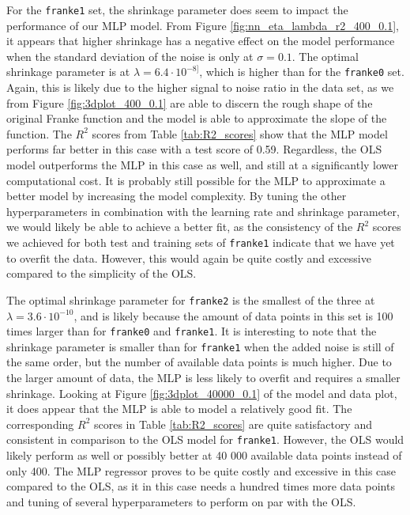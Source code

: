 \documentclass[a4paper, 11pt, twocolumn]{article}
\begin{document}
For the \texttt{franke1} set, the shrinkage parameter does seem to impact the 
performance of our MLP model. From Figure \ref{fig:nn_eta_lambda_r2_400_0.1}, it 
appears that higher shrinkage has a negative effect on the model performance when 
the standard deviation of the noise is only at $\sigma=0.1$. The 
optimal shrinkage parameter is at $\lambda=6.4\cdot 10^{-8]}$, which is higher 
than for the \texttt{franke0} set. Again, this is likely due to the higher signal 
to noise ratio in the data set, as we from Figure \ref{fig:3dplot_400_0.1} are 
able to discern the rough shape of the original Franke function and the model is 
able to approximate the slope of the function. The $R^2$ scores from Table 
\ref{tab:R2_scores} show that the MLP model performs far better in this case with 
a test score of 0.59. Regardless, the OLS model outperforms the MLP in this case 
as well, and still at a significantly lower computational cost. It is probably 
still possible for the MLP to approximate a better model by increasing the model 
complexity. By tuning the other hyperparameters in combination with the learning 
rate and shrinkage parameter, we would likely be able to achieve a better fit, as 
the consistency of the $R^2$ scores we achieved for both test and training sets 
of \texttt{franke1} indicate that we have yet to overfit the data. However, this 
would again be quite costly and excessive compared to the simplicity of the OLS. 

The optimal shrinkage parameter for \texttt{franke2} is the smallest of the three 
at $\lambda=3.6\cdot 10^{-10}$, and is likely because the amount of data points 
in this set is 100 times larger than for \texttt{franke0} and \texttt{franke1}. 
It is interesting to note that the shrinkage parameter is smaller than for 
\texttt{franke1} when the added noise is still of the same order, but the number 
of available data points is much higher. Due to the larger amount of data, the 
MLP is less likely to overfit and requires a smaller shrinkage. Looking at Figure 
\ref{fig:3dplot_40000_0.1} of the model and data plot, it does appear that the 
MLP is able to model a relatively good fit. The corresponding $R^2$ scores in 
Table \ref{tab:R2_scores} are quite satisfactory and consistent in comparison to 
the OLS model for \texttt{franke1}. However, the OLS would likely perform as well 
or possibly better at 40 000 available data points instead of only 400. The MLP 
regressor proves to be quite costly and excessive in this case compared to the 
OLS, as it in this case needs a hundred times more data points and tuning of 
several hyperparameters to perform on par with the OLS. \\
\end{document}
